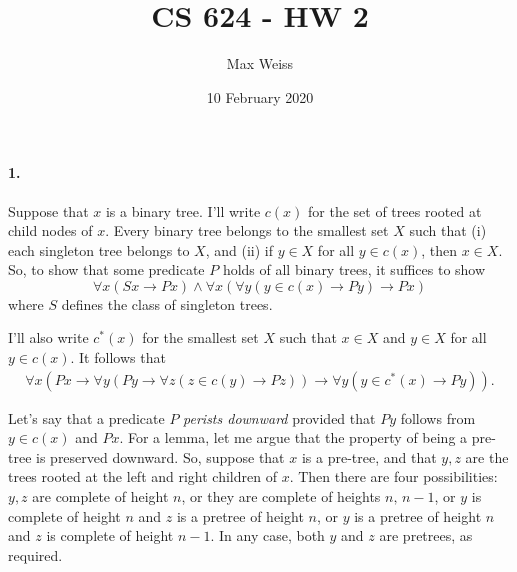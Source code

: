 \documentclass[
]{article}
\date{10 February 2020}
\title{CS 624 - HW 2}
\author{Max Weiss}
\begin{document}
\maketitle

\paragraph{1.} 


Suppose that $x$ is a binary tree.  I'll write $c(x)$ for the set of trees rooted at child nodes of $x$.  Every binary tree belongs to the smallest set $X$ such that (i) each singleton tree belongs to $X$, and (ii) if $y\in X$ for all $y\in c(x)$, then $x\in X$.  So, to show that some predicate $P$ holds of all binary trees, it suffices to show
\begin{equation}
  \label{eq:treeInduction}
  \forall x (Sx\to Px) \land \forall x(\forall y(y\in c(x)\to Py)\to Px)
\end{equation}
where $S$ defines the class of singleton trees.

I'll also write $c^*(x)$ for the smallest set $X$ such that $x\in X$ and $y\in X$ for all $y\in c(x)$.  It follows that
\begin{align}
  \label{eq:childInduction}
  \forall x
  (Px \to \forall y (Py\to \forall z(z\in c(y)\to Pz))
  \to
  \forall y(y\in c^*(x)\to Py)).
\end{align}

Let's say that a predicate $P$ \emph{perists downward} provided that $Py$ follows from $y\in c(x)$ and $Px$.  For a lemma, let me argue that the property of being a pre-tree is preserved downward.  So, suppose that $x$ is a pre-tree, and that $y,z$ are the trees rooted at the left and right children of $x$.  Then there are four possibilities: $y,z$ are complete of height $n$, or they are complete of heights $n,\,n-1$, or $y$ is complete of height $n$ and $z$ is a pretree of height $n$, or $y$ is a pretree of height $n$ and $z$ is complete of height $n-1$.  In any case, both $y$ and $z$ are pretrees, as required.
\end{document}
